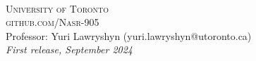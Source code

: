 \documentclass[openany,11pt,fleqn]{book} %
\begin{document}
\newpage
~\vfill
\thispagestyle{empty}


\noindent\textsc{University of Toronto}\\

\noindent \textsc{github.com/Nasr-905}\\ %

\noindent Professor: Yuri Lawryshyn (yuri.lawryshyn@utoronto.ca)\\ %

\noindent \textit{First release, September 2024} %



\pagestyle{empty} %

\tableofcontents %


\pagestyle{fancy} %






% 

% 

% 

% 
\end{document}
